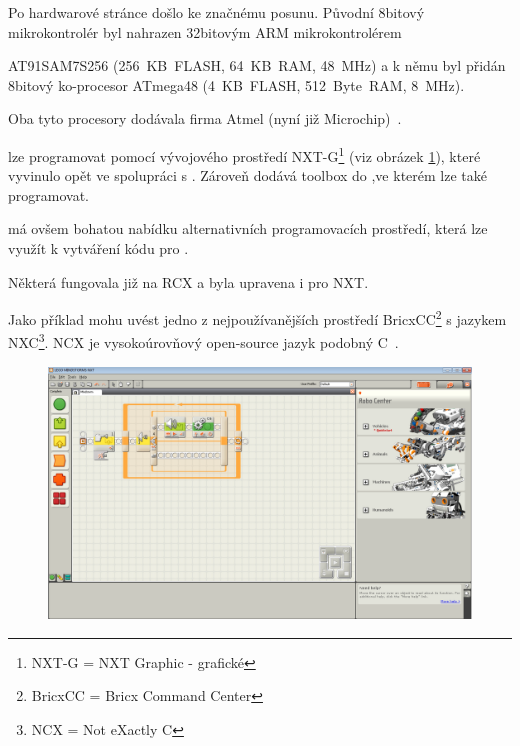 Po hardwarové stránce došlo ke značnému posunu. Původní 8bitový mikrokontrolér byl nahrazen 32bitovým ARM mikrokontrolérem %

AT91SAM7S256 (256~KB~FLASH, 64~KB~RAM, 48~MHz) a k němu byl přidán 8bitový ko-procesor ATmega48 (4~KB~FLASH, 512~Byte~RAM, 8~MHz). 

Oba tyto procesory dodávala firma Atmel (nyní již Microchip)~\cite{legoMindstormsNXT_hardware}.


\brick{ }lze programovat pomocí vývojového prostředí NXT-G\footnote{NXT-G = NXT Graphic - grafické} (viz obrázek \ref{fig:lego-mindstorms-nxt-g}), které \lego{ }vyvinulo opět ve spolupráci s  \NI{~}\cite{legoMindstormsNXT_NXT-G}. 
Zároveň \NI{ }dodává toolbox do \labview{ },ve kterém lze \brick{ }také programovat. 

\legoNXT{ }má ovšem bohatou nabídku alternativních programovacích prostředí, která lze využít k vytváření kódu pro \brick. 

Některá fungovala již na RCX a byla upravena i pro NXT. 

Jako příklad mohu uvést jedno z nejpoužívanějších prostředí BricxCC\footnote{BricxCC = Bricx Command Center} s jazykem NXC\footnote{NCX = Not eXactly C}. 
NCX je vysokoúrovňový open-source jazyk podobný C~\cite{legoWikipediaNXT_NXC}.

\begin{figure}[h]
	\centering
	\includegraphics[width=\textwidth]{images/lego-mindstorms-nxt-g.png}
	\caption[]{\protect\footnotemark}
	\label{fig:lego-mindstorms-nxt-g}
\end{figure}

